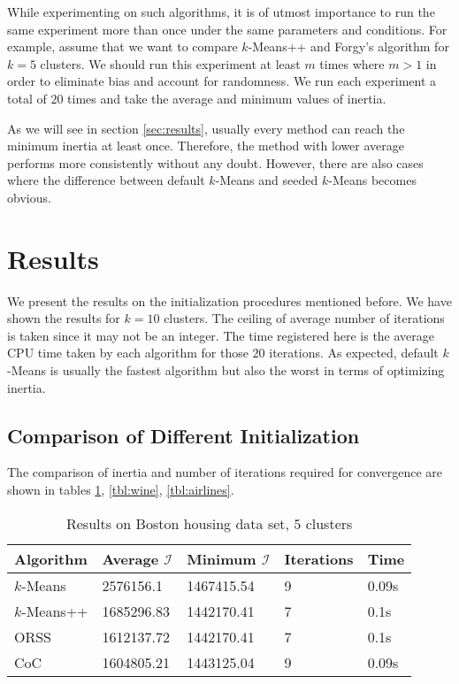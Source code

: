 \documentclass[twoside, 11pt]{article}
\newcommand{\I}{\mathcal{I}}
\begin{document}
	While experimenting on such algorithms, it is of utmost importance to run the same experiment more than once under the same parameters and conditions. For example, assume that we want to compare $k$-Means++ and Forgy's algorithm \citep{forgy} for $k=5$ clusters. We should run this experiment at least $m$ times where $m>1$ in order to eliminate bias and account for randomness. We run each experiment a total of $20$ times and take the average and minimum values of inertia.
	
	As we will see in section \eqref{sec:results}, usually every method can reach the minimum inertia at least once. Therefore, the method with lower average performs more consistently without any doubt. However, there are also cases where the difference between default $k$-Means and seeded $k$-Means becomes obvious.
	\section{Results}\label{sec:results}
	We present the results on the initialization procedures mentioned before. We have shown the results for $k=10$ clusters. The ceiling of average number of iterations is taken since it may not be an integer. The time registered here is the average CPU time taken by each algorithm for those $20$ iterations. As expected, default $k$-Means is usually the fastest algorithm but also the worst in terms of optimizing inertia.
	\subsection{Comparison of Different Initialization}
	The comparison of inertia and number of iterations required for convergence are shown in tables \ref{tbl:boston}, \ref{tbl:wine}, \ref{tbl:airlines}. 
		\begin{table}
			\begin{center}
				\begin{tabular}{|l|l|l|l|l|}
					\hline
					Algorithm & Average $\I$& Minimum $\I$& Iterations & Time\\\hline
					$k$-Means & 2576156.1& 1467415.54& 9& 0.09s\\\hline
					$k$-Means++ & 1685296.83& 1442170.41& 7& 0.1s\\\hline
					ORSS & 1612137.72& 1442170.41& 7& 0.1s\\\hline
					CoC & 1604805.21& 1443125.04& 9& 0.09s\\\hline
				\end{tabular}
			\caption{Results on Boston housing data set, $5$ clusters}
			\label{tbl:boston}
			\end{center}
		\end{table}
	
\end{document}
